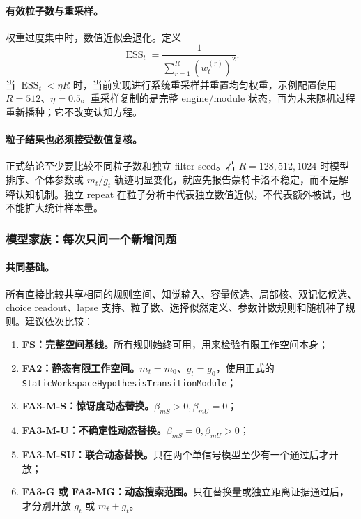 \paragraph{有效粒子数与重采样。}
权重过度集中时，数值近似会退化。定义
\begin{equation}
\operatorname{ESS}_t
=\frac{1}{\sum_{r=1}^{R}(w^{(r)}_t)^2}.
\label{eq:model0809-ess}
\end{equation}
当 $\operatorname{ESS}_t<\eta R$ 时，当前实现进行系统重采样并重置均匀权重，示例配置使用 $R=512$、$\eta=0.5$。重采样复制的是完整 engine/module 状态，再为未来随机过程重新播种；它不改变认知方程。

\paragraph{粒子结果也必须接受数值复核。}
正式结论至少要比较不同粒子数和独立 filter seed。若 $R=128,512,1024$ 时模型排序、个体参数或 $m_t/g_t$ 轨迹明显变化，就应先报告蒙特卡洛不稳定，而不是解释认知机制。独立 repeat 在粒子分析中代表独立数值近似，不代表额外被试，也不能扩大统计样本量。


\subsubsection{模型家族：每次只问一个新增问题}

\paragraph{共同基础。}
所有直接比较共享相同的规则空间、知觉输入、容量候选、局部核、双记忆候选、choice readout、lapse 支持、粒子数、选择似然定义、参数计数规则和随机种子规则。建议依次比较：
\begin{enumerate}
    \item \textbf{FS：完整空间基线。}所有规则始终可用，用来检验有限工作空间本身；
    \item \textbf{FA2：静态有限工作空间。}$m_t=m_0$、$g_t=g_0$，使用正式的
    \texttt{StaticWorkspaceHypothesisTransitionModule}；
    \item \textbf{FA3-M-S：惊讶度动态替换。}$\beta_{mS}>0,\beta_{mU}=0$；
    \item \textbf{FA3-M-U：不确定性动态替换。}$\beta_{mS}=0,\beta_{mU}>0$；
    \item \textbf{FA3-M-SU：联合动态替换。}只在两个单信号模型至少有一个通过后才开放；
    \item \textbf{FA3-G 或 FA3-MG：动态搜索范围。}只在替换量或独立距离证据通过后，才分别开放 $g_t$ 或 $m_t+g_t$。
\end{enumerate}

